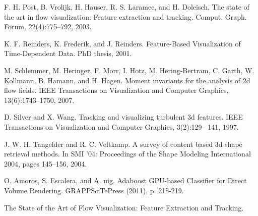 \documentclass[10pt, conference, compsocconf]{IEEEtran}
\begin{document}
\begin{thebibliography}{1}
\bibitem{}
F. H. Post, B. Vrolijk, H. Hauser, R. S. Laramee, and H. Doleisch. The state of the art in flow visualization: Feature extraction and tracking. Comput. Graph. Forum, 22(4):775–792, 2003.

\bibitem{}
K. F. Reinders, K. Frederik, and J. Reinders. Feature-Based Visualization of Time-Dependent Data. PhD thesis, 2001. 

\bibitem{}
M. Schlemmer, M. Heringer, F. Morr, I. Hotz, M. Hering-Bertram, C. Garth, W. Kollmann, B. Hamann, and H. Hagen. Moment invariants for the analysis of 2d flow fields. IEEE Transactions on Visualization and Computer Graphics, 13(6):1743–1750, 2007.

\bibitem{}
D. Silver and X. Wang. Tracking and visualizing turbulent 3d features. IEEE Transactions on Visualization and Computer Graphics, 3(2):129– 141, 1997.

\bibitem{}
J. W. H. Tangelder and R. C. Veltkamp. A survey of content based 3d shape retrieval methods. In SMI ’04: Proceedings of the Shape Modeling International 2004, pages 145–156, 2004.

\bibitem{}
O. Amoros, S. Escalera, and A. uig. Adaboost GPU-based Classifier for Direct Volume Rendering. GRAPPSciTePress (2011), p. 215-219.

\bibitem{}
The State of the Art of Flow Visualization: Feature Extraction and Tracking. 

\end{thebibliography}

\end{document}
